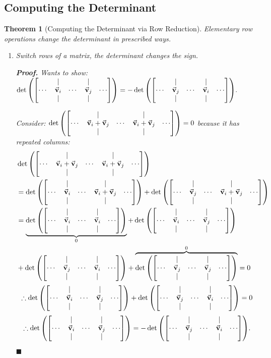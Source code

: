 \documentclass[12pt, a4paper]{article}
\newtheorem{thm}{Theorem}[subsection]
\newenvironment*{prf}{\par\indent\textbf{\textit{Proof. }}}{\hfill $\blacksquare$\par}
\def\vecv{\va{v}}
\begin{document}
\subsection{Computing the Determinant}

\begin{thm}[Computing the Determinant via Row Reduction] 
	Elementary row operations change the determinant in prescribed ways. 
	\begin{enumerate}
		\item Switch rows of a matrix, the determinant changes the sign.
		\begin{prf}
			Wants to show: $\det\qty(\mqty[{&|&&|&\\\cdots&\vecv_i&\cdots&\vecv_j&\cdots\\&|&&|&}])=-\det\qty(\mqty[{&|&&|&\\\cdots&\vecv_j&\cdots&\vecv_i&\cdots\\&|&&|&}]).$\par Consider: $\det\qty(\mqty[&|&&|&\\\cdots&\vecv_i+\vecv_j&\cdots&\vecv_i+\vecv_j&\cdots\\&|&&|&])=0$ because it has repeated columns: \[\begin{aligned}&\det\qty(\mqty[&|&&|&\\\cdots&\vecv_i+\vecv_j&\cdots&\vecv_i+\vecv_j&\cdots\\&|&&|&])\\&=\det\qty(\mqty[&|&&|&\\\cdots&\vecv_i&\cdots&\vecv_i+\vecv_j&\cdots\\&|&&|&])+\det\qty(\mqty[&|&&|&\\\cdots&\vecv_j&\cdots&\vecv_i+\vecv_j&\cdots\\&|&&|&])\\&=\underbrace{\det\qty(\mqty[&|&&|&\\\cdots&\vecv_i&\cdots&\vecv_i&\cdots\\&|&&|&])}_{0}+\det\qty(\mqty[&|&&|&\\\cdots&\vecv_i&\cdots&\vecv_j&\cdots\\&|&&|&])\\&+\det\qty(\mqty[&|&&|&\\\cdots&\vecv_j&\cdots&\vecv_i&\cdots\\&|&&|&])+\overbrace{\det\qty(\mqty[&|&&|&\\\cdots&\vecv_j&\cdots&\vecv_j&\cdots\\&|&&|&])}^{0}=0\end{aligned}\]\[\therefore\det\qty(\mqty[&|&&|&\\\cdots&\vecv_i&\cdots&\vecv_j&\cdots\\&|&&|&])+\det\qty(\mqty[&|&&|&\\\cdots&\vecv_j&\cdots&\vecv_i&\cdots\\&|&&|&])=0\]\[\therefore\det\qty(\mqty[&|&&|&\\\cdots&\vecv_i&\cdots&\vecv_j&\cdots\\&|&&|&])=-\det\qty(\mqty[&|&&|&\\\cdots&\vecv_j&\cdots&\vecv_i&\cdots\\&|&&|&]).\]

\end{prf}
\end{enumerate}
\end{thm}
\end{document}
